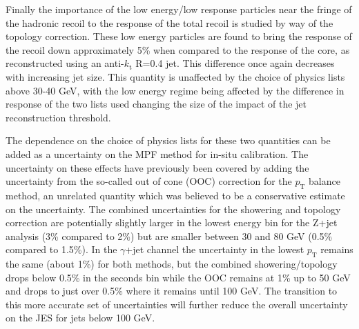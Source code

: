 Finally the importance of the low energy/low response particles near the fringe of the hadronic recoil to the response of the total recoil is studied by way of the topology correction.  
These low energy particles are found to bring the response of the recoil down approximately 5\% when compared to the response of the core, as reconstructed using an anti-$k_\mathrm{t}$ R=0.4 jet.  
This difference once again decreases with increasing jet size.  
This quantity is unaffected by the choice of physics lists above 30-40 GeV, with the low energy regime being affected by the difference in response of the two lists used changing the size of the impact of the jet reconstruction threshold.  

The dependence on the choice of physics lists for these two quantities can be added as a uncertainty on the MPF method for in-situ calibration.  
The uncertainty on these effects have previously been covered by adding the uncertainty from the so-called out of cone (OOC) correction for the $p_{\mathrm{T}}$ balance method, an unrelated quantity which was believed to be a conservative estimate on the uncertainty.  
The combined uncertainties for the showering and topology correction are potentially slightly larger in the lowest energy bin for the Z+jet analysis (3\% compared to 2\%) but are smaller between 30 and 80 GeV (0.5\% compared to 1.5\%).  
In the $\gamma$+jet channel the uncertainty in the lowest $p_{\mathrm{T}}$ remains the same (about 1\%) for both methods, but the combined showering/topology drops below 0.5\% in the seconds bin while the OOC remains at 1\% up to 50 GeV and drops to just over 0.5\% where it remains until 100 GeV.  
The transition to this more accurate set of uncertainties will further reduce the overall uncertainty on the JES for jets below 100 GeV.  
 



